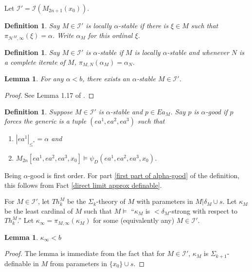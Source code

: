 \documentclass[12pt]{article}
\newtheorem{lemma}[theorem]{Lemma}
\newtheorem{definition}[theorem]{Definition}
\newcommand\I{\mathcal{I}}
\renewcommand\H{\mathcal{H}}
\begin{document}
{Let $\I' = \I (M_{2n+1}(x_0))$.

\begin{definition}
    Say $M \in \mathcal{I}'$ is locally $\alpha$-stable if there is $\xi\in M$ such that $\pi_{\H^M,\infty}(\xi)=\alpha$. Write $\alpha_M$ for this ordinal $\xi$.
\end{definition}

\begin{definition}
    Say $M\in \mathcal{I}'$ is $\alpha$-stable if $M$ is locally $\alpha$-stable and whenever $N$ is a complete iterate of $M$, $\pi_{M,N}(\alpha_M) = \alpha_N$.
\end{definition}

\begin{lemma}
    For any $\alpha < b$, there exists an $\alpha$-stable $M\in \I'$.
\end{lemma}
\begin{proof}
    See Lemma 1.17 of \cite{hra}.
\end{proof}

\begin{definition}
    Suppose $M\in\I'$ is $\alpha$-stable and $p\in Ea_M$. Say $p$ is $\alpha$-good if $p$ forces the generic is a tuple $(ea^1,ea^2,ea^3)$ such that
    \begin{enumerate}
        \item \label{first part of alpha-good} $|ea^1|_{\leq^*} = \alpha$ and
        \item \label{second part of alpha-good} $M_{2n}[ea^1,ea^2,ea^3,x_0] \models \psi_D(ea^1,ea^2,ea^3,x_0)$.
    \end{enumerate}
\end{definition}

Being $\alpha$-good is first order. For part \ref{first part of alpha-good} of the definition, this follows from Fact \ref{direct limit approx definable}.

For $M\in \I'$, let $Th^M_k$ be the $\Sigma_k$-theory of $M$ with parameters in $M|\delta_M \cup s$. Let $\kappa_M$ be the least cardinal of $M$ such that $M\models$ ``$\kappa_M$ is $<\delta_M$-strong with respect to $Th^M_k$.'' Let $\kappa_\infty = \pi_{M,\infty}(\kappa_M)$ for some (equivalently any) $M\in \I'$.

\begin{lemma}
\label{least strong below b}
    $\kappa_\infty < b$
\end{lemma}
\begin{proof}
    The lemma is immediate from the fact that for $M\in \I'$, $\kappa_M$ is $\Sigma_{k+1}$-definable in $M$ from parameters in $\{x_0\} \cup s$.
\end{proof}

}
\end{document}
